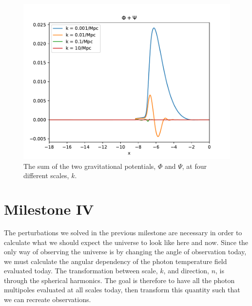 \documentclass{aa}
\begin{document}
\begin{figure}[h!]
   \includegraphics[scale=0.6]{../figures/milestone3/phi_psi.pdf}
   \caption{The sum of the two gravitational potentials, $\Phi$ and $\Psi$, at four different scales, $k$.}\label{fig:phi_psi}
\end{figure}



\section{Milestone IV}
The perturbations we solved in the previous milestone are necessary in order to calculate what we should expect the universe to look like here and now. Since the only way of observing the universe
is by changing the angle of observation today, we must calculate the angular dependency of the photon temperature field evaluated today. The transformation between scale, $k$, and
direction, $n$, is through the spherical harmonics. The goal is therefore to have all the photon multipoles evaluated at all scales today, then transform this quantity
such that we can recreate observations.  
\end{document}
